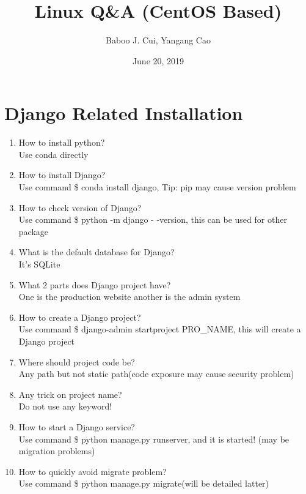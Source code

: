 \documentclass[10pt,a4paper,oneside]{article}
\date{June 20, 2019}
\author{Baboo J. Cui, Yangang Cao}
\title{Linux Q\&A (CentOS Based)}
\begin{document}
\maketitle
\tableofcontents

\newpage

\section{Django Related Installation}
\begin{enumerate}[1.]
\item How to install python?\\
Use conda directly
\item How to install Django?\\
Use command \$ conda install django, Tip: pip may cause version problem
\item How to check version of Django?\\
Use command \$ python -m django - -version, this can be used for other package
\item What is the default database for Django?\\
It’s SQLite
\item What 2 parts does Django project have?\\
One is the production website another is the admin system
\item How to create a Django project?\\
Use command \$ django-admin startproject PRO\_NAME, this will create a Django project
\item Where should project code be?\\
Any path but not static path(code exposure may cause security problem)
\item Any trick on project name?\\
Do not use any keyword!
\item How to start a Django service?\\
Use command \$ python manage.py runserver, and it is started! (may be migration problems)
\item How to quickly avoid migrate problem?\\
Use command \$ python manage.py migrate(will be detailed latter)
\end{enumerate}
\end{document}
